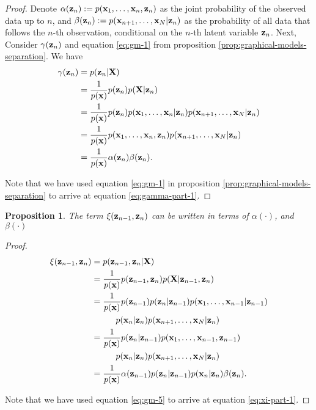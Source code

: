 \documentclass[11pt]{article}
\numberwithin{equation}{section}
\newcommand{\x}{{\bf x}}
\newcommand{\X}{{\bf X}}
\newcommand{\z}{{\bf z}}
\newtheorem{proposition}{Proposition}[section]
\begin{document}
\begin{proof}
Denote $\alpha(\z_n) := p(\x_1, \ldots, \x_n, \z_n)$ as the joint probability of the observed data up to $n$, and $\beta(\z_n) := p(\x_{n+1}, \ldots, \x_N\vert \z_n)$ as the probability of all data that follows the $n$-th observation, conditional on the $n$-th latent variable $\z_n$. Next, Consider  $\gamma(\z_n)$ and equation \eqref{eq:gm-1} from proposition \ref{prop:graphical-models-separation}. We have
\begin{align}
	\gamma(\z_n) &= p(\z_n \vert {\bf X})\\
					  &= \frac{1}{p(\x)}p(\z_n)p({\bf X} \vert \z_n)\\
					  &= \frac{1}{p(\x)} p(\z_n) p(\x_1, \ldots, \x_n\vert \z_n) p(\x_{n+1}, \ldots, \x_N\vert \z_n) \label{eq:gamma-part-1}\\
					  &= \frac{1}{p(\x)}p(\x_1, \ldots, \x_n, \z_n) p(\x_{n+1}, \ldots, \x_N\vert \z_n)\\
					  &= \frac{1}{p(\x)}\alpha(\z_n)\beta(\z_n).
\end{align}

Note that we have used equation \eqref{eq:gm-1} in proposition \ref{prop:graphical-models-separation} to arrive at equation \eqref{eq:gamma-part-1}.
\end{proof}


\begin{proposition}\label{prop:xi-factorisation}
	The term $\xi(\z_{n-1}, \z_n)$ can be written in terms of $\alpha({\cdot})$, and $\beta(\cdot)$
\end{proposition}

\begin{proof}
	\begin{align}
		\xi(\z_{n-1}, \z_{n}) &= p(\z_{n-1}, \z_{n} \vert \X)\\
		&= \frac{1}{p(\x)}p(\z_{n-1}, \z_{n}) p(\X \vert \z_{n-1}, \z_{n})\\
		&= \frac{1}{p(\x)} p(\z_{n-1}) p(\z_{n} \vert \z_{n-1}) p(\x_1, \ldots, \x_{n-1}\vert \z_{n-1}) \nonumber \\
			&\hspace{1cm} p(\x_n\vert \z_n) p(\x_{n+1}, \ldots, \x_N \vert \z_n) \label{eq:xi-part-1}\\
		&= \frac{1}{p(\x)} p(\z_{n} \vert \z_{n-1}) p(\x_1, \ldots, \x_{n-1}, \z_{n-1}) \nonumber \\
			&\hspace{1cm} p(\x_n\vert \z_n) p(\x_{n+1}, \ldots, \x_N \vert \z_n)\\
		&= \frac{1}{p(\x)} \alpha(\z_{n-1}) p(\z_{n} \vert \z_{n-1}) p(\x_n \vert \z_n) \beta(\z_n).
	\end{align}
	
	Note that we have used equation \eqref{eq:gm-5} to arrive at equation \eqref{eq:xi-part-1}.
\end{proof}
\end{document}
